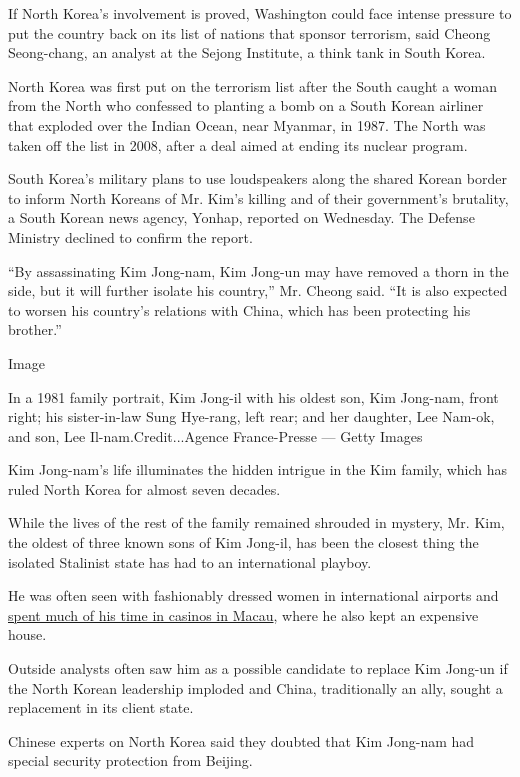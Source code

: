 If North Korea's involvement is proved, Washington could face intense
pressure to put the country back on its list of nations that sponsor
terrorism, said Cheong Seong-chang, an analyst at the Sejong Institute,
a think tank in South Korea.

North Korea was first put on the terrorism list after the South caught a
woman from the North who confessed to planting a bomb on a South Korean
airliner that exploded over the Indian Ocean, near Myanmar, in 1987. The
North was taken off the list in 2008, after a deal aimed at ending its
nuclear program.

South Korea's military plans to use loudspeakers along the shared Korean
border to inform North Koreans of Mr. Kim's killing and of their
government's brutality, a South Korean news agency, Yonhap, reported on
Wednesday. The Defense Ministry declined to confirm the report.

``By assassinating Kim Jong-nam, Kim Jong-un may have removed a thorn in
the side, but it will further isolate his country,'' Mr. Cheong said.
``It is also expected to worsen his country's relations with China,
which has been protecting his brother.''

Image

In a 1981 family portrait, Kim Jong-il with his oldest son, Kim
Jong-nam, front right; his sister-in-law Sung Hye-rang, left rear; and
her daughter, Lee Nam-ok, and son, Lee Il-nam.Credit...Agence
France-Presse --- Getty Images

Kim Jong-nam's life illuminates the hidden intrigue in the Kim family,
which has ruled North Korea for almost seven decades.

While the lives of the rest of the family remained shrouded in mystery,
Mr. Kim, the oldest of three known sons of Kim Jong-il, has been the
closest thing the isolated Stalinist state has had to an international
playboy.

He was often seen with fashionably dressed women in international
airports and
\href{https://mobile.nytimes.com/2007/02/01/world/asia/01iht-macao.4431509.html}{spent
much of his time in casinos in Macau}, where he also kept an expensive
house.

Outside analysts often saw him as a possible candidate to replace Kim
Jong-un if the North Korean leadership imploded and China, traditionally
an ally, sought a replacement in its client state.

Chinese experts on North Korea said they doubted that Kim Jong-nam had
special security protection from Beijing.

